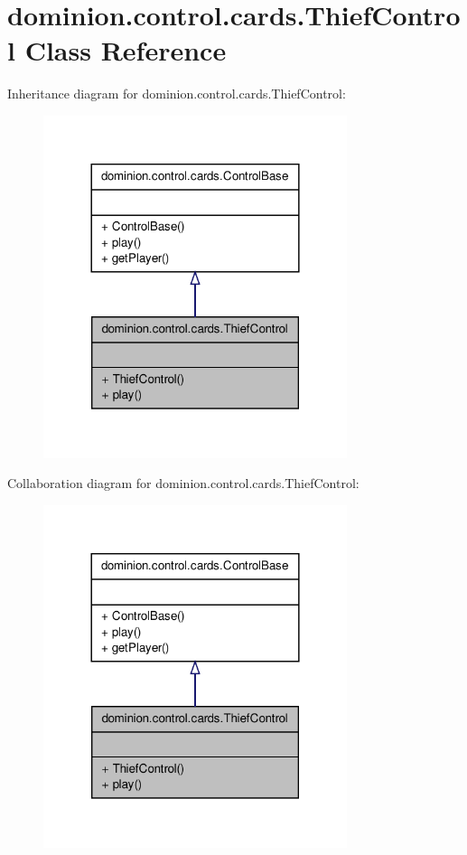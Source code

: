 \hypertarget{classdominion_1_1control_1_1cards_1_1ThiefControl}{\section{dominion.\-control.\-cards.\-Thief\-Control \-Class \-Reference}
\label{classdominion_1_1control_1_1cards_1_1ThiefControl}
}


\-Inheritance diagram for dominion.\-control.\-cards.\-Thief\-Control\-:
\nopagebreak
\begin{figure}[H]
\begin{center}
\leavevmode
\includegraphics[width=252pt]{classdominion_1_1control_1_1cards_1_1ThiefControl__inherit__graph}
\end{center}
\end{figure}


\-Collaboration diagram for dominion.\-control.\-cards.\-Thief\-Control\-:
\nopagebreak
\begin{figure}[H]
\begin{center}
\leavevmode
\includegraphics[width=252pt]{classdominion_1_1control_1_1cards_1_1ThiefControl__coll__graph}
\end{center}
\end{figure}
